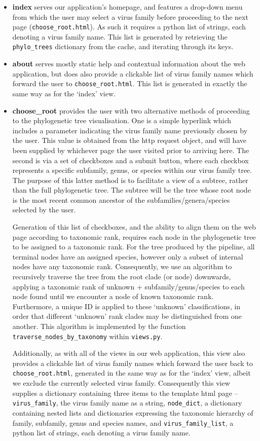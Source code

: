 \documentclass[12pt,a4paper]{article}
\begin{document}
\begin{itemize}
\item {\bf index} serves our application's homepage, and features a drop-down menu from which the user may select a virus family before proceeding to the next page (\texttt{choose\_root.html}). As such it requires a python list of strings, each denoting a virus family name. This list is generated by retrieving the \texttt{phylo\_trees} dictionary from the cache, and iterating through its keys.
\item {\bf about} serves mostly static help and contextual information about the web application, but does also provide a clickable list of virus family names which forward the user to \texttt{choose\_root.html}. This list is generated in exactly the same way as for the `index' view.
\item {\bf choose\_root} provides the user with two alternative methods of proceeding to the phylogenetic tree visualisation. One is a simple hyperlink which includes a parameter indicating the virus family name previously chosen by the user. This value is obtained from the http request object, and will have been supplied by whichever page the user visited prior to arriving here. The second is via a set of checkboxes and a submit button, where each checkbox represents a specific subfamily, genus, or species within our virus family tree. The purpose of this latter method is to facilitate a view of a subtree, rather than the full phylogenetic tree. The subtree will be the tree whose root node is the most recent common ancestor of the subfamilies/genera/species selected by the user. 

Generation of this list of checkboxes, and the ability to align them on the web page according to taxonomic rank, requires each node in the phylogenetic tree to be assigned to a taxonomic rank. For the tree produced by the pipeline, all terminal nodes have an assigned species, however only a subset of internal nodes have any taxonomic rank. Consequently, we use an algorithm to recursively traverse the tree from the root clade (or node) downwards, applying a taxonomic rank of unknown + subfamily/genus/species to each node found until we encounter a node of known taxonomic rank. Furthermore, a unique ID is applied to these `unknown' classifications, in order that different `unknown' rank clades may be distinguished from one another. This algorithm is implemented by the function \texttt{traverse\_nodes\_by\_taxonomy} within \texttt{views.py}.

Additionally, as with all of the views in our web application, this view also provides a clickable list of virus family names which forward the user back to \texttt{choose\_root.html}, generated in the same way as for the `index' view, albeit we exclude the currently selected virus family. Consequently this view supplies a dictionary containing three items to the template html page -- \texttt{virus\_family}, the virus family name as a string, \texttt{node\_dict}, a dictionary containing nested lists and dictionaries expressing the taxonomic hierarchy of family, subfamily, genus and species names, and \texttt{virus\_family\_list}, a python list of strings, each denoting a virus family name.


\end{itemize}
\end{document}
